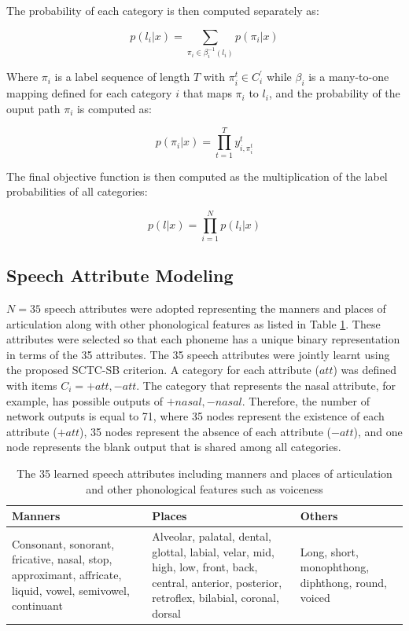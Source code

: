 \documentclass[12pt]{elsarticle}
\begin{document}
The probability of each category is then computed separately as:

\begin{equation}
    \label{eq:MCTC2}
    p(l_i|x)=\sum_{\pi_{i}\in\beta_{i}^{-1}(l_i)}p(\pi_i|x)
\end{equation}

Where $\pi_i$ is a label sequence of length $T$ with $\pi_i^t\in C_i^{'}$ while $\beta_i$ is a many-to-one mapping defined for each category $i$ that maps $\pi_i$ to $l_i$, and the probability of the ouput path $\pi_i$ is computed as:

\begin{equation}
    \label{eq:MCTC3}
    p(\pi_i|x)=\prod^T_{t=1}y^t_{i,\pi^t_i}
\end{equation}

The final objective function is then computed as the multiplication of the label probabilities of all categories:

\begin{equation}
    \label{eq:MCTC4}
    p(l|x)=\prod_{i=1}^N p(l_i|x)
\end{equation}

\subsection{Speech Attribute Modeling}
$N = 35$ speech attributes were adopted representing the manners and places of articulation along with other phonological features as listed in Table \ref{tab:attrlist}. These attributes were selected so that each phoneme has a unique binary representation in terms of the 35 attributes. The 35 speech attributes were jointly learnt using the proposed SCTC-SB criterion. A category for each attribute ($att$) was defined with items $C_i={+att,-att}$. The category that represents the nasal attribute, for example, has possible outputs of {$+nasal,-nasal$}. Therefore, the number of network outputs is equal to 71, where 35 nodes represent the existence of each attribute ($+att$), 35 nodes represent the absence of each attribute ($-att$), and one node represents the blank output that is shared among all categories.

\begin{table}
\centering
\caption{\label{tab:attrlist} The 35 learned speech attributes including manners and places of articulation and other phonological features such as voiceness \cite{RN296}}
\begin{tabular}{m{4cm} m{4cm} m{4cm}}
 \hline
 \centering\textbf{Manners}  &  \centering\textbf{Places} & \centering\arraybackslash\textbf{Others} \\
 \hline
 Consonant, sonorant, fricative, nasal, stop, approximant, affricate, liquid, vowel, semivowel, continuant  & Alveolar, palatal, dental, glottal, labial, velar, mid, high, low, front, back, central, anterior, posterior, retroflex, bilabial, coronal, dorsal  & Long, short, monophthong, diphthong, round, voiced \\
 \hline
 \end{tabular}
\end{table}
\end{document}

